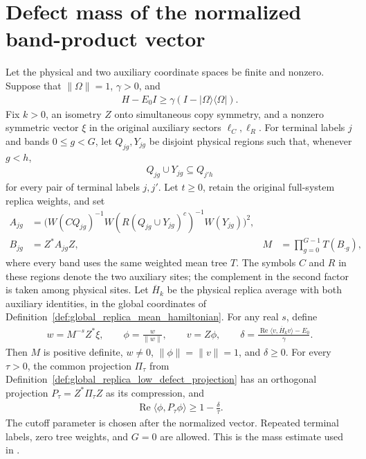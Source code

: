 \section{Defect mass of the normalized band-product vector}
\label{sec:regional_low_defect_product_mass}

\begin{theorem}
\label{thm:regional_low_defect_product_mass}
\leanok
Let the physical and two auxiliary coordinate spaces be finite and nonzero.
Suppose that $\|\Omega\|=1$, $\gamma>0$, and
\begin{align*}
 H-E_0I\geq\gamma(I-|\Omega\rangle\langle\Omega|).
\end{align*}
Fix $k>0$, an isometry $Z$ onto simultaneous copy symmetry, and a nonzero
symmetric vector $\xi$ in the original auxiliary sectors
$\ell_C,\ell_R$. For terminal labels $j$ and bands $0\leq g<G$, let
$Q_{jg},Y_{jg}$ be disjoint physical regions such that, whenever $g<h$,
\begin{align*}
 Q_{jg}\cup Y_{jg}\subseteq Q_{j'h}
\end{align*}
for every pair of terminal labels $j,j'$. Let $t\geq0$, retain the
original full-system replica weights, and set
\begin{align*}
 A_{jg}&=\bigl(W(CQ_{jg})^{-1}
 W(R(Q_{jg}\cup Y_{jg})^c)^{-1}W(Y_{jg})\bigr)^2,\\
 B_{jg}&=Z^*A_{jg}Z,
 &M&=\prod_{g=0}^{G-1}T(B_{\cdot g}),
\end{align*}
where every band uses the same weighted mean tree $T$.
The symbols $C$ and $R$ in these regions denote the two auxiliary sites;
the complement in the second factor is taken among physical sites.
Let $\overline H_k$ be the physical replica average with both auxiliary
identities, in the global coordinates of
Definition~\ref{def:global_replica_mean_hamiltonian}.
For any real $s$, define
\begin{align*}
 w=M^{-s}Z^*\xi,\qquad
 \phi=\frac{w}{\|w\|},\qquad v=Z\phi,\qquad
 \delta=\frac{\operatorname{Re}\langle v,\overline H_kv\rangle-E_0}{\gamma}.
\end{align*}
Then $M$ is positive definite, $w\ne0$, $\|\phi\|=\|v\|=1$, and
$\delta\geq0$. For every $\tau>0$, the common projection
$\Pi_\tau$ from Definition~\ref{def:global_replica_low_defect_projection}
has an orthogonal projection $P_\tau=Z^*\Pi_\tau Z$ as its compression, and
\begin{align*}
 \operatorname{Re}\langle\phi,P_\tau\phi\rangle
 \geq 1-\frac{\delta}{\tau}.
\end{align*}
The cutoff parameter is chosen after the normalized vector. Repeated
terminal labels, zero tree weights, and $G=0$ are allowed.
This is the mass estimate used in
\cite[Section~8, lines~421--443]{OpenAI2026AreaLaw}.
\end{theorem}
